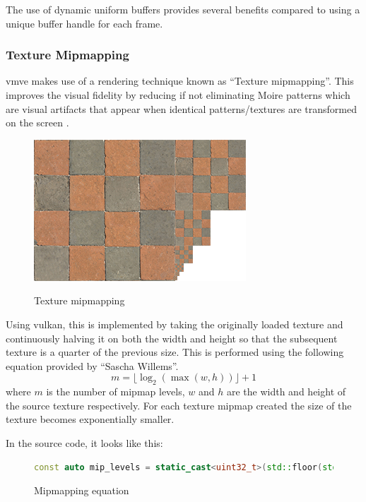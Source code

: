 \documentclass[11pt]{article}
\begin{document}
The use of dynamic uniform buffers provides several benefits compared to using a
unique buffer handle for each frame.

\subsubsection{Texture Mipmapping}
\gls*{vmve} makes use of a rendering technique known as ``Texture mipmapping''.
This improves the visual fidelity by reducing if not eliminating Moire patterns
which are visual artifacts that appear when identical patterns/textures are
transformed on the screen \cite{moire_pattern}.

\begin{figure}[H]
  \centering
  \includegraphics[width=\textwidth]{images/mipmaps.png}
  \caption{Texture mipmapping}
  \label{fig:texture_mipmapping} \cite{texture_mipmaps}
\end{figure}


Using \gls*{vulkan}, this is implemented by taking the originally loaded texture
and continuously halving it on both the width and height so that the subsequent texture is
a quarter of the previous size. This is performed using the following equation provided by
``Sascha Willems''.
\begin{equation}
  m = \lfloor \log_2(\max(w, h)) \rfloor + 1
\end{equation}
where \(m\) is the number of mipmap levels, \(w\) and \(h\) are the width and
height of the source texture respectively. For each texture mipmap created the
size of the texture becomes exponentially smaller.

In the source code, it looks like this:
\begin{figure}[H]
  \centering
  \begin{lstlisting}[language=C++]
    const auto mip_levels = static_cast<uint32_t>(std::floor(std::log2(std::max(width, height)))) + 1;
  \end{lstlisting}
  \caption{Mipmapping equation}
  \label{fig:mipmapping_equation}
\end{figure}
\end{document}

